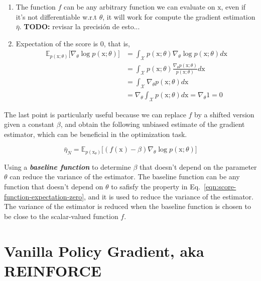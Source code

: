 \begin{enumerate}
    \item The function $f$ can be any arbitrary function we can evaluate on $\mathrm{x}$, even if it's not differentiable w.r.t $\theta$, it will work for compute the gradient estimation $\bar{\eta}$. \textbf{TODO:} revisar la precisión de esto...
    \item Expectation of the score is $0$, that is,
    \begin{equation}\label{eqn:score-function-expectation-zero}
    \begin{split}
        \mathbb{E}_{p(\mathrm{x};\theta)}\big[\nabla_{\theta}\log p(\mathrm{x};\theta)\big] 
        &= \int_{\mathcal{X}}p(\mathrm{x};\theta)\nabla_{\theta}\log p(\mathrm{x}; \theta) d\mathrm{x} \\
        &= \int_{\mathcal{X}} p(\mathrm{x};\theta)\frac{\nabla_{\theta} p(\mathrm{x}; \theta)}{p(\mathrm{x};\theta)}d\mathrm{x} \\
        &= \int_{\mathcal{X}}\nabla_{\theta}p(\mathrm{x};\theta)d\mathrm{x} \\
        &= \nabla_{\theta}\int_{\mathcal{X}} p(\mathrm{x}; \theta)d\mathrm{x} = \nabla_{\theta} 1 =0
    \end{split}
    \end{equation}
\end{enumerate}

The last point is particularly useful because we can replace $f$ by a shifted
version given a constant $\beta$, and obtain the following unbiased estimate of
the gradient estimator, which can be beneficial in the optimization task.

\begin{equation}\label{eqn:score-function-gradient-estimator-baseline}
\bar{\eta}_{N} = \mathbb{E}_{p(\mathrm{x}_{\theta})}\big[(f(\mathrm{x}) - \beta) \nabla_{\theta} \log p(\mathrm{x}; \theta)\big]
\end{equation}

Using a \textbf{\textit{baseline function}} to determine $\beta$ that doesn't
depend on the parameter $\theta$ can reduce the variance of the estimator. The
baseline function can be any function that doesn't depend on $\theta$ to
safisfy the property in Eq.~\ref{eqn:score-function-expectation-zero}, and it is used to reduce the variance of the estimator. The variance of the estimator is reduced when the baseline function is chosen to be close to the scalar-valued function $f$.

\section{Vanilla Policy Gradient, aka REINFORCE}

